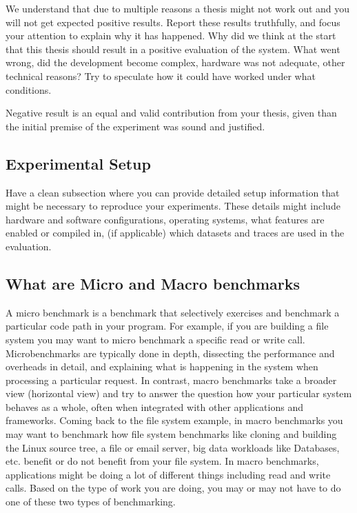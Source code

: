 \documentclass[11pt]{article}
\begin{document}
We understand that due to multiple reasons a thesis might not work out and you will not get expected positive results. Report these results truthfully, and focus your attention to explain why it has happened. Why did we think at the start that this thesis should result in a positive evaluation of the system. What went wrong, did the development become complex, hardware was not adequate, other technical reasons? Try to speculate how it could have worked under what conditions. 

Negative result is an equal and valid contribution from your thesis, given than the initial premise of the experiment was sound and justified. 

\subsection{Experimental Setup}
Have a clean subsection where you can provide detailed setup information that might be necessary to reproduce your experiments. These details might include hardware and software configurations, operating systems, what features are enabled or compiled in, (if applicable) which datasets and traces are used in the evaluation. 

\subsection*{What are Micro and Macro benchmarks}
A micro benchmark is a benchmark that selectively exercises and benchmark a particular code path in your program. For example, if you are building a file system you may want to micro benchmark a specific read or write call. Microbenchmarks are typically done in depth, dissecting the performance and overheads in detail, and explaining what is happening in the system when processing a particular request. In contrast, macro benchmarks take a broader view (horizontal view) and try to answer the question how your particular system behaves as a whole, often when integrated with other applications and frameworks. Coming back to the file system example, in macro benchmarks you may want to benchmark how file system benchmarks like cloning and building the Linux source tree, a file or email server, big data workloads like Databases, etc. benefit or do not benefit from your file system. In macro benchmarks, applications might be doing a lot of different things including read and write calls. Based on the type of work you are doing, you may or may not have to do one of these two types of benchmarking. 
\end{document}
